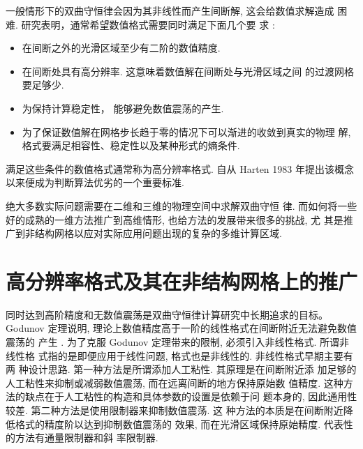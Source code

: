 一般情形下的双曲守恒律会因为其非线性而产生间断解, 这会给数值求解造成
困难. 研究表明，通常希望数值格式需要同时满足下面几个要
求 \cite{LeVeque1992a,Harten1983}:
\begin{itemize}
\item 在间断之外的光滑区域至少有二阶的数值精度.
\item 在间断处具有高分辨率. 这意味着数值解在间断处与光滑区域之间
  的过渡网格要足够少.
\item 为保持计算稳定性， 能够避免数值震荡的产生.
\item 为了保证数值解在网格步长趋于零的情况下可以渐进的收敛到真实的物理
  解, 格式要满足相容性、稳定性以及某种形式的熵条件.
\end{itemize}
满足这些条件的数值格式通常称为高分辨率格式. 自从 Harten
\cite{Harten1983} 1983 年提出该概念以来便成为判断算法优劣的一个重要标准.

绝大多数实际问题需要在二维和三维的物理空间中求解双曲守恒
律. 而如何将一些好的成熟的一维方法推广到高维情形, 也给方法的发展带来很多的挑战, 尤
其是推广到非结构网格以应对实际应用问题出现的复杂的多维计算区域.


\section{高分辨率格式及其在非结构网格上的推广}
\label{sec:unstru-cfd}

同时达到高阶精度和无数值震荡是双曲守恒律计算研究中长期追求的目标。
Godunov 定理说明,  理论上数值精度高于一阶的线性格式在间断附近无法避免数值震荡的
产生 \cite{Godunov1959,engquist1981}.
为了克服 Godunov 定理带来的限制, 必须引入非线性格式. 所谓非线性格
式指的是即便应用于线性问题, 格式也是非线性的. 非线性格式早期主要有两
种设计思路. 第一种方法是所谓添加人工粘性. 其原理是在间断附近添
加足够的人工粘性来抑制或减弱数值震荡, 而在远离间断的地方保持原始数
值精度. 这种方法的缺点在于人工粘性的构造和具体参数的设置是依赖于问
题本身的, 因此通用性较差. 第二种方法是使用限制器来抑制数值震荡. 这
种方法的本质是在间断附近降低格式的精度阶以达到抑制数值震荡的
效果, 而在光滑区域保持原始精度. 代表性的方法有通量限制器和斜
率限制器\cite{HARTEN1972568,Harten1983,Sweby1984,Leer1979}.

